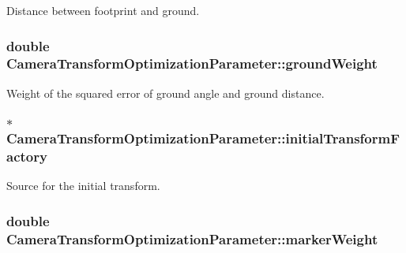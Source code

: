 \-Distance between footprint and ground. \hypertarget{classCameraTransformOptimizationParameter_a6903913052edf580ad47b3e68da6b173}{
\subsubsection[{ground\-Weight}]{\setlength{\rightskip}{0pt plus 5cm}double {\bf \-Camera\-Transform\-Optimization\-Parameter\-::ground\-Weight}}}\label{classCameraTransformOptimizationParameter_a6903913052edf580ad47b3e68da6b173}
\-Weight of the squared error of ground angle and ground distance. \hypertarget{classCameraTransformOptimizationParameter_aaa19ab7384e804ea0bfc6051700ff9f1}{
\subsubsection[{initial\-Transform\-Factory}]{$\ast$ {\bf \-Camera\-Transform\-Optimization\-Parameter\-::initial\-Transform\-Factory}}}\label{classCameraTransformOptimizationParameter_aaa19ab7384e804ea0bfc6051700ff9f1}
\-Source for the initial transform. \hypertarget{classCameraTransformOptimizationParameter_abcb7e55046194fb133a3cd5e63f22b66}{
\subsubsection[{marker\-Weight}]{\setlength{\rightskip}{0pt plus 5cm}double {\bf \-Camera\-Transform\-Optimization\-Parameter\-::marker\-Weight}}}\label{classCameraTransformOptimizationParameter_abcb7e55046194fb133a3cd5e63f22b66}
